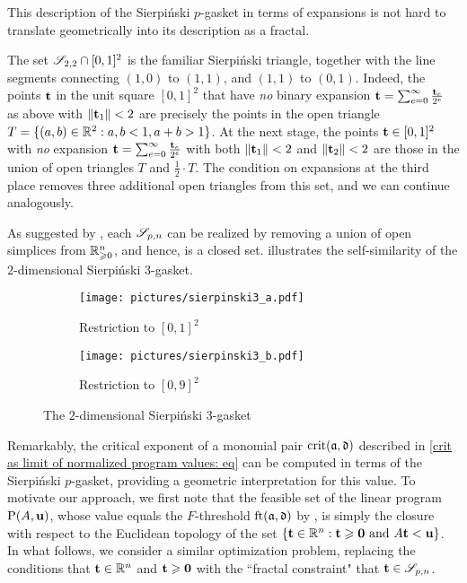 \documentclass{amsart}
\begin{document}
This description of the Sierpi\'nski $p$-gasket in terms of expansions is not hard to translate geometrically into its description as a fractal.

\begin{example}
\label{sierpinski triangle: E}
The set $\mathscr{S}_{2,2} \cap [0,1]^2$ is the familiar Sierpi\'nski triangle, together with the line segments connecting $(1,0)$ to $(1,1)$, and $(1,1)$ to $(0,1)$.
Indeed, the points $\mathbf{t}$ in the unit square $[0,1]^2$ that have \emph{no} binary expansion $\mathbf{t} = \sum_{e=0}^{\infty}\frac{\mathbf{t}_e}{2^e}$ as above with $\| \mathbf{t}_1 \| < 2$ are precisely the points in the open triangle  $T = \{ (a,b) \in \mathbb{R}^2 : a,b < 1, a+b > 1 \}$.
At the next stage, the points $\mathbf{t} \in [0,1]^2$ with \emph{no} expansion $\mathbf{t} = \sum_{e=0}^{\infty}\frac{\mathbf{t}_e}{2^e}$ with both  $\| \mathbf{t}_1 \| < 2$ and $\| \mathbf{t}_2 \| < 2$ are those in the union of open triangles $T$ and $\frac{1}{2} \cdot T$.  The condition on expansions at the third place removes three additional open triangles from this set, and we can continue analogously.
\end{example}


As suggested by , each $\mathscr{S}_{p,n}$  can be realized by removing a union of open simplices from $\mathbb{R}_{\geqslant 0}^n$, and hence, is a closed set.
 illustrates the self-similarity of the $2$-dimensional Sierpi\'nski $3$-gasket.

\begin{figure}
\begin{subfigure}{.49\textwidth}
  \centering
  \texttt{[image: pictures/sierpinski3\_a.pdf]}
  \caption{Restriction to $[0,1]^2$}
\end{subfigure}
\begin{subfigure}{.49\textwidth}
  \centering
  \texttt{[image: pictures/sierpinski3\_b.pdf]}
  \caption{Restriction to $[0,9]^2$}
\end{subfigure}
\caption{The $2$-dimensional Sierpi\'nski 3-gasket}
\label{fig: sierpinski 3-gasket}
\end{figure}


Remarkably, the critical exponent of a monomial pair $\operatorname{crit}(\mathfrak{a}, \mathfrak{d})$ described in \eqref{crit as limit of normalized program values: eq} can be computed in terms of the Sierpi\'nski $p$-gasket, providing a geometric interpretation for this value.  To motivate our approach, we first note that the feasible set of the linear program $\mathrm{P}(A, \mathbf{u})$, whose value equals the $F$-threshold $\operatorname{ft}(\mathfrak{a}, \mathfrak{d})$ by , is simply the closure with respect to the Euclidean topology of the set $\{ \mathbf{t} \in \mathbb{R}^n : \mathbf{t} \geqslant \mathbf{0} \text{ and } A\mathbf{t} < \mathbf{u} \}$.  In what follows, we consider a similar optimization problem,  replacing the conditions that $\mathbf{t} \in \mathbb{R}^n$ and $\mathbf{t} \geqslant \mathbf{0}$ with the ``fractal constraint" that $\mathbf{t} \in \mathscr{S}_{p,n}$.
\end{document}
